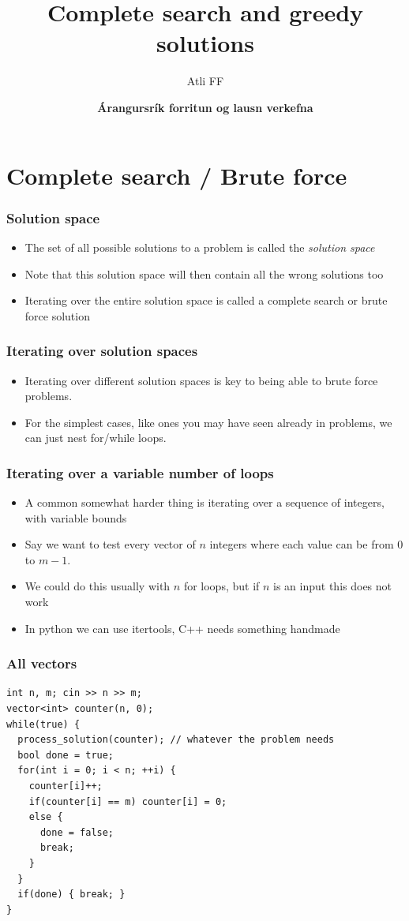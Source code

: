 \documentclass{beamer}
\title{Complete search and greedy solutions}
\author{Atli FF}
\institute{\href{http://ru.is/td}{School of Computer Science} \\[2pt] \href{http://ru.is}{Reykjavík University}}
\date{\textbf{Árangursrík forritun og lausn verkefna}}
\begin{document}
\begin{frame}[plain]
    \titlepage
\end{frame}

\section*{Complete search / Brute force}

\begin{frame}[plain]
	\frametitle{Solution space}
	\begin{itemize}
		 \item The set of all possible solutions to a problem is called the \textit{solution space}
		 \item Note that this solution space will then contain all the wrong solutions too
		 \item Iterating over the entire solution space is called a complete search or brute force solution
	\end{itemize}
\end{frame}

\begin{frame}[plain]
	\frametitle{Iterating over solution spaces}
	\begin{itemize}
		 \item Iterating over different solution spaces is key to being able to brute force problems.
		 \item For the simplest cases, like ones you may have seen already in problems, we can just nest for/while loops.
	\end{itemize}
\end{frame}

\begin{frame}[plain]
	\frametitle{Iterating over a variable number of loops}
	\begin{itemize}
		 \item A common somewhat harder thing is iterating over a sequence of integers, with variable bounds
		 \item Say we want to test every vector of $n$ integers where each value can be from $0$ to $m - 1$.
		 \item We could do this usually with $n$ for loops, but if $n$ is an input this does not work
		 \item In python we can use itertools, C++ needs something handmade
	\end{itemize}
\end{frame}

\begin{frame}
	\frametitle{All vectors}
	\begin{verbatim}
int n, m; cin >> n >> m;
vector<int> counter(n, 0);
while(true) {
  process_solution(counter); // whatever the problem needs
  bool done = true;
  for(int i = 0; i < n; ++i) {
    counter[i]++;
    if(counter[i] == m) counter[i] = 0;
    else {
      done = false;
      break;
    }
  }
  if(done) { break; }
}
	\end{verbatim}
\end{frame}
\end{document}
